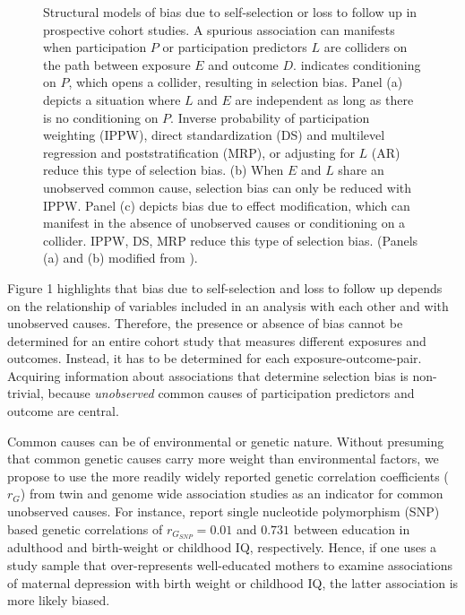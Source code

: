 \documentclass[12pt]{article}
\newcommand*\circled[1]{\tikz[baseline=(char.base)]{
		\node[shape=circle,draw,inner sep=2pt] (char) {#1};}}
\begin{document}
\begin{figure}[h]
	\centering
	\caption{Structural models of bias due to self-selection or loss to follow up in prospective cohort studies. A spurious association can manifests when participation $P$ or participation predictors $L$ are colliders on the path between exposure $E$ and outcome $D$. \protect\circled{$P$} indicates conditioning on $P$, which opens a collider, resulting in selection bias. Panel (a) depicts a situation where $L$ and $E$ are independent as long as there is no conditioning on $P$. Inverse probability of participation weighting (IPPW), direct standardization (DS) and multilevel regression and poststratification (MRP), or adjusting for $L$ (AR) reduce this type of selection bias. (b) When $E$ and $L$ share an unobserved common cause, selection bias can only be reduced with IPPW. Panel (c) depicts bias due to effect modification, which can manifest in the absence of unobserved causes or conditioning on a collider. IPPW, DS, MRP reduce this type of selection bias. (Panels (a) and (b) modified from \cite{Hernan2004-oz}).}
	\label{fig:SelectionBias}
\end{figure}


Figure 1 highlights that bias due to self-selection and loss to follow up depends on the relationship of variables included in an analysis with each other and with unobserved causes. Therefore, the presence or absence of bias cannot be determined for an entire cohort study that measures different exposures and outcomes. Instead, it has to be determined for each exposure-outcome-pair. Acquiring information about associations that determine selection bias is non-trivial, because \emph{unobserved} common causes of participation predictors and outcome are central. 

Common causes can be of environmental \cite{Johnson2011-wi,Verweij2013-xk} or genetic nature. Without presuming  that common genetic causes carry more weight than environmental factors, we propose to use the more readily widely reported genetic correlation coefficients ($r_G$) from twin \cite{Tambs2012-km} and genome wide association studies \cite{Bulik-Sullivan2015-er} as an indicator for common unobserved causes. For instance, \citeauthor{Bulik-Sullivan2015-xn} \cite{Bulik-Sullivan2015-xn} report single nucleotide polymorphism (SNP) based genetic correlations of $r_{G_{SNP}}=0.01$ and $0.731$ between education in adulthood and birth-weight or childhood IQ, respectively. Hence, if one uses a study sample that over-represents well-educated mothers to examine associations of maternal depression with birth weight or childhood IQ, the latter association is more likely biased.
\end{document}
